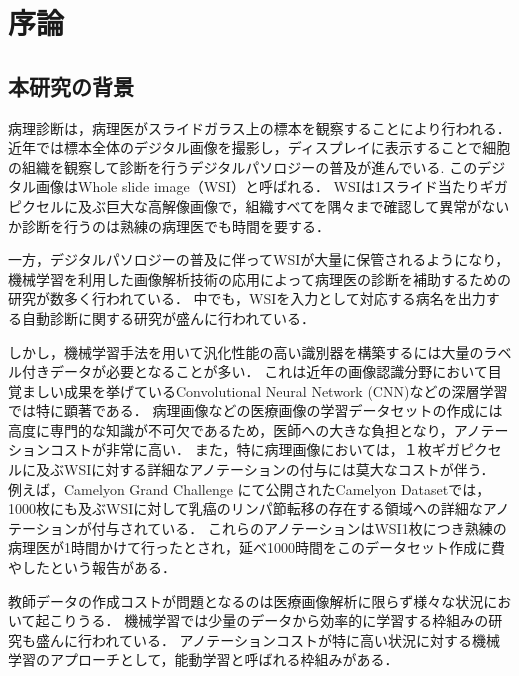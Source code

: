 \chapter{序論}

\section{本研究の背景}

病理診断は，病理医がスライドガラス上の標本を観察することにより行われる．
近年では標本全体のデジタル画像を撮影し，ディスプレイに表示することで細胞の組織を観察して診断を行うデジタルパソロジーの普及が進んでいる\cite{pantanowitz2010digital}.
このデジタル画像はWhole slide image（WSI）と呼ばれる．
WSIは1スライド当たりギガピクセルに及ぶ巨大な高解像画像で，組織すべてを隅々まで確認して異常がないか診断を行うのは熟練の病理医でも時間を要する．

一方，デジタルパソロジーの普及に伴ってWSIが大量に保管されるようになり，機械学習を利用した画像解析技術の応用によって病理医の診断を補助するための研究が数多く行われている\cite{gurcan2009histopathological, komuraishikawa, litjens2017survey}．
中でも，WSIを入力として対応する病名を出力する自動診断に関する研究が盛んに行われている\cite{doyle2008automated,dundar2011computerized}．

しかし，機械学習手法を用いて汎化性能の高い識別器を構築するには大量のラベル付きデータが必要となることが多い．
これは近年の画像認識分野において目覚ましい成果を挙げているConvolutional Neural Network (CNN)などの深層学習では特に顕著である．
病理画像などの医療画像の学習データセットの作成には高度に専門的な知識が不可欠であるため，医師への大きな負担となり，アノテーションコストが非常に高い．
また，特に病理画像においては，１枚ギガピクセルに及ぶWSIに対する詳細なアノテーションの付与には莫大なコストが伴う．
例えば，Camelyon Grand Challenge \cite{Camelyon17}にて公開されたCamelyon Datasetでは，1000枚にも及ぶWSIに対して乳癌のリンパ節転移の存在する領域への詳細なアノテーションが付与されている．
これらのアノテーションはWSI1枚につき熟練の病理医が1時間かけて行ったとされ，延べ1000時間をこのデータセット作成に費やしたという報告がある．

教師データの作成コストが問題となるのは医療画像解析に限らず様々な状況において起こりうる．
機械学習では少量のデータから効率的に学習する枠組みの研究も盛んに行われている．
アノテーションコストが特に高い状況に対する機械学習のアプローチとして，能動学習\cite{settles2010active}と呼ばれる枠組みがある．

